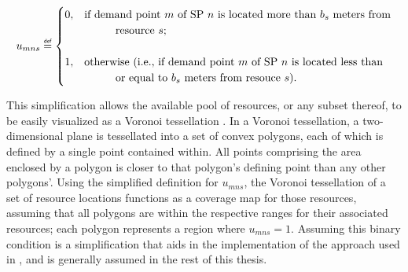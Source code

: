 \documentclass[12pt,dvipsnames]{report}
\newcommand\defeq{\mathrel{\overset{\makebox[0pt]{\mbox{\normalfont\tiny\sffamily def}}}{=}}}
\newcommand\tab[1][1cm]{\hspace*{#1}}
\begin{document}
\iftrue %
\begin{singlespacing}
\begin{equation} \label{eq:umns_simp}
u_{mns} \defeq
	\begin{cases}
		0,& \text{if demand point $m$ of SP $n$ is located more than $b_s$ meters from}\\
		& \text{\tab resource $s$;}\\
		\\
		1,& \text{otherwise (i.e., if demand point $m$ of SP $n$ is located less than}\\
		& \text{\tab or equal to $b_s$ meters from resouce $s$).}\\
	\end{cases}
\end{equation}
\end{singlespacing}
\else
\begin{equation} \label{eq:umns_simp}
u_{mns} \defeq
	\begin{cases}
		0,& \text{if demand point $m$ of SP $n$ is located more than $b_s$ meters from}\\
		& \text{\tab resource $s$;}\\
		1,& \text{otherwise (i.e., if demand point $m$ of SP $n$ is located less than}\\
		& \text{\tab or equal to $b_s$ meters from resouce $s$).}\\
	\end{cases}
\end{equation}
\fi

This simplification allows the available pool of resources, or any subset thereof, to be easily visualized as a Voronoi tessellation \cite{Aurenhammer:1991:VDS:116873.116880}.  In a Voronoi tessellation, a two-dimensional plane is tessellated into a set of convex polygons, each of which is defined by a single point contained within.  All points comprising the area enclosed by a polygon is closer to that polygon's defining point than any other polygons'.  Using the simplified definition for $u_{mns}$, the Voronoi tessellation of a set of resource locations functions as a coverage map for those resources, assuming that all polygons are within the respective ranges for their associated resources; each polygon represents a region where $u_{mns} = 1$.  Assuming this binary condition is a simplification that aids in the implementation of the approach used in , and is generally assumed in the rest of this thesis.
\end{document}
